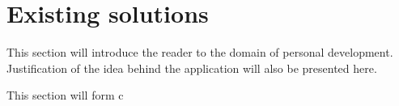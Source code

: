 
\chapter{Existing solutions}\label{ch:existing-solutions}

This section will introduce the reader to the domain of personal development.
Justification of the idea behind the application will also be presented here.

This section will form c







